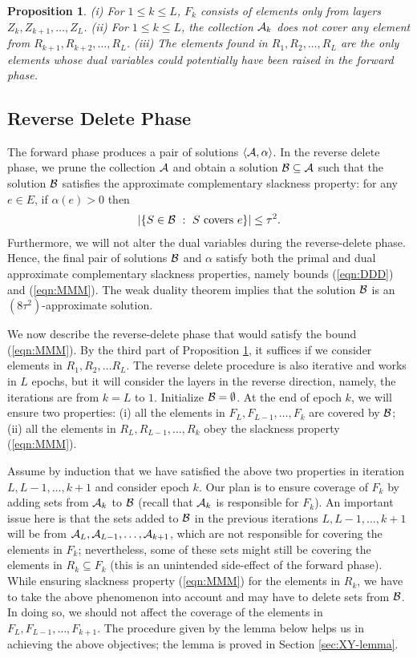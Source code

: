 \documentclass[11pt]{article}
\newtheorem{proposition}[theorem]{\bf Proposition}
\newcommand{\calA} {{\cal A}}
\newcommand{\calB} {{\cal B}}
\newcommand{\pair}[2] {\langle #1, #2\rangle}
\begin{document}
\begin{proposition}
\label{prop:XXX}
(i) For $1\leq k\leq L$, $F_k$ consists of elements only from layers $Z_k, Z_{k+1}, \ldots, Z_L$.
(ii) For $1\leq k\leq L$, the collection $\calA_k$ does not cover any element from $R_{k+1}, R_{k+2},\ldots, R_L$.
(iii) The elements found in $R_1, R_2, \ldots, R_L$ are the only elements whose dual variables could 
potentially have been raised in the forward phase.
\end{proposition}

\subsection{Reverse Delete Phase}
The forward phase produces a pair of solutions $\pair{\calA}{\alpha}$.
In the reverse delete phase, we prune the collection $\calA$ and obtain a solution $\calB\subseteq \calA$
such that the solution $\calB$ satisfies the approximate complementary slackness property: for any $e\in E$, if $\alpha(e)>0$ then
\begin{eqnarray}
\label{eqn:MMM}
|\{S\in \calB~:~S\mbox{ covers } e\}| \leq \tau^2.
\end{eqnarray}
Furthermore, we will not alter the dual variables during the reverse-delete phase.
Hence, the final pair of solutions $\calB$ and $\alpha$ satisfy 
both the primal and dual approximate complementary slackness properties, namely bounds (\ref{eqn:DDD}) and
(\ref{eqn:MMM}). The weak duality theorem implies that the solution $\calB$ is an $(8\tau^2)$-approximate solution.

We now describe the reverse-delete phase that would satisfy the bound (\ref{eqn:MMM}).
By the third part of Proposition \ref{prop:XXX},
it suffices if we consider elements in $R_1, R_2, \ldots R_L$.
The reverse delete procedure is also iterative and works in $L$ epochs, 
but it will consider the layers in the reverse direction,
namely, the iterations are from $k=L$ to $1$.
Initialize $\calB=\emptyset$. 
At the end of epoch $k$, we will ensure two properties: 
(i) all the elements in $F_L, F_{L-1}, \ldots, F_k$ are covered by $\calB$;
(ii) all the elements in $R_L, R_{L-1}, \ldots, R_k$ obey  the slackness property (\ref{eqn:MMM}).

Assume by induction that we have satisfied the above two properties in iteration $L, L-1, \ldots, k+1$
and consider epoch $k$. Our plan is to ensure coverage of $F_k$ by adding sets from $\calA_k$ to $\calB$
(recall that $\calA_k$ is responsible for $F_k$).
An important issue here is that the sets added to $\calB$ in the previous iterations 
$L, L-1, \ldots, k+1$ will be from $\calA_L, \calA_{L-1}, \ldots, \calA_{k+1}$, 
which are not responsible for covering the elements in $F_k$; nevertheless, some of these sets might still be 
covering the elements in $R_k\subseteq F_k$ (this is an unintended side-effect of the forward phase).
While ensuring slackness property (\ref{eqn:MMM}) for the elements in $R_k$,
we have to take the above phenomenon into account and may have to delete sets from $\calB$.
In doing so, we should not affect the coverage of the elements in $F_L, F_{L-1}, \ldots, F_{k+1}$.
The procedure given by the lemma below helps us in achieving the above objectives;
the lemma is proved in Section \ref{sec:XY-lemma}.
\end{document}
